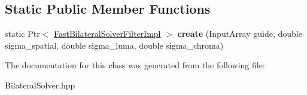 \subsection*{Static Public Member Functions}
\begin{DoxyCompactItemize}
\item 
static Ptr$<$ \hyperlink{classcv_1_1xim_1_1FastBilateralSolverFilterImpl}{Fast\+Bilateral\+Solver\+Filter\+Impl} $>$ {\bfseries create} (Input\+Array guide, double sigma\+\_\+spatial, double sigma\+\_\+luma, double sigma\+\_\+chroma)\hypertarget{classcv_1_1xim_1_1FastBilateralSolverFilterImpl_af921ce7f4381f8c1882ba9b6ebfe46e5}{}\label{classcv_1_1xim_1_1FastBilateralSolverFilterImpl_af921ce7f4381f8c1882ba9b6ebfe46e5}

\end{DoxyCompactItemize}


The documentation for this class was generated from the following file\+:\begin{DoxyCompactItemize}
\item 
Bilateral\+Solver.\+hpp\end{DoxyCompactItemize}
